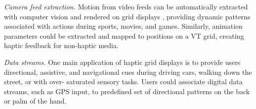 \emph{Camera feed extraction.}
Motion from video feeds can be automatically extracted with computer vision and rendered on grid displays \cite{Kim2014}, providing dynamic patterns associated with actions during sports, movies, and games.
Similarly, animation parameters could be extracted and mapped to positions on a VT grid, creating haptic feedback for non-haptic media.

\emph{Data streams.}
One main application of haptic grid displays is to provide users directional, assistive, and navigational cues during driving cars, walking down the street, or with over-
saturated sensory tasks.
Users could associate digital data streams, such as GPS input, to predefined set of directional patterns on the back or palm of the hand.


%




